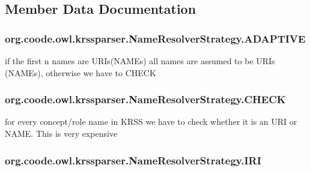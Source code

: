\subsection{Member Data Documentation}
\hypertarget{enumorg_1_1coode_1_1owl_1_1krssparser_1_1_name_resolver_strategy_a132044ee556c52dcdff84e0ad4173715}{
\subsubsection[{A\-D\-A\-P\-T\-I\-V\-E}]{\setlength{\rightskip}{0pt plus 5cm}org.\-coode.\-owl.\-krssparser.\-Name\-Resolver\-Strategy.\-A\-D\-A\-P\-T\-I\-V\-E}}\label{enumorg_1_1coode_1_1owl_1_1krssparser_1_1_name_resolver_strategy_a132044ee556c52dcdff84e0ad4173715}
if the first n names are U\-R\-Is(\-N\-A\-M\-Es) all names are assumed to be U\-R\-Is (N\-A\-M\-Es), otherwise we have to C\-H\-E\-C\-K \hypertarget{enumorg_1_1coode_1_1owl_1_1krssparser_1_1_name_resolver_strategy_aa5241f0fc45ba0b818628a5ded5ee88e}{
\subsubsection[{C\-H\-E\-C\-K}]{\setlength{\rightskip}{0pt plus 5cm}org.\-coode.\-owl.\-krssparser.\-Name\-Resolver\-Strategy.\-C\-H\-E\-C\-K}}\label{enumorg_1_1coode_1_1owl_1_1krssparser_1_1_name_resolver_strategy_aa5241f0fc45ba0b818628a5ded5ee88e}
for every concept/role name in K\-R\-S\-S we have to check whether it is an U\-R\-I or N\-A\-M\-E. This is very expensive \hypertarget{enumorg_1_1coode_1_1owl_1_1krssparser_1_1_name_resolver_strategy_a38ca051a496b2cc014c4ec51ebd892d4}{
\subsubsection[{I\-R\-I}]{\setlength{\rightskip}{0pt plus 5cm}org.\-coode.\-owl.\-krssparser.\-Name\-Resolver\-Strategy.\-I\-R\-I}}\label{enumorg_1_1coode_1_1owl_1_1krssparser_1_1_name_resolver_strategy_a38ca051a496b2cc014c4ec51ebd892d4}
